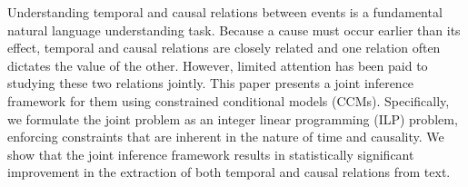 Understanding temporal and causal relations between events is a fundamental natural language understanding task. Because a cause must occur earlier than its effect, temporal and causal relations are closely related and one relation often dictates the value of the other. However, limited attention has been paid to studying these two relations jointly. This paper presents a joint inference framework for them using constrained conditional models (CCMs). Specifically, we formulate the joint problem as an integer linear programming (ILP) problem, enforcing constraints that are inherent in the nature of time and causality. We show that the joint inference framework results in statistically significant improvement in the extraction of both temporal and causal relations from text.
